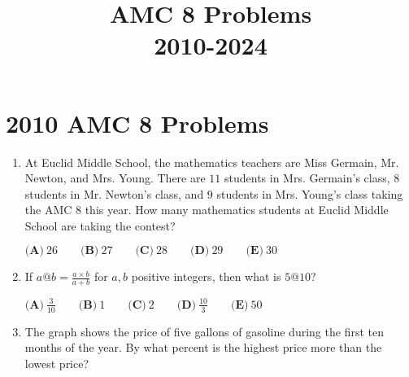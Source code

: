 \documentclass{article}
\title{AMC 8 Problems \\ 2010-2024}
\date{}
\begin{document}
\maketitle\thispagestyle{fancy}\tableofcontents\newpage\section*{2010 AMC 8 Problems}

\begin{enumerate}[label=\arabic*., itemsep=0.5em]
\item At Euclid Middle School, the mathematics teachers are Miss Germain, Mr. Newton, and Mrs. Young. There are \(11\) students in Mrs. Germain's class, \(8\) students in Mr. Newton's class, and \(9\) students in Mrs. Young's class taking the AMC 8 this year. How many mathematics students at Euclid Middle School are taking the contest? 

\( \textbf{(A)}\ 26 \qquad\textbf{(B)}\ 27\qquad\textbf{(C)}\ 28\qquad\textbf{(D)}\ 29\qquad\textbf{(E)}\ 30 \)\par \vspace{0.5em}\item If \(a @ b = \frac{a\times b}{a+b}\) for \(a,b\) positive integers, then what is \(5 @ 10\)? 

\(\textbf{(A)}\ \frac{3}{10} \qquad\textbf{(B)}\ 1 \qquad\textbf{(C)}\ 2 \qquad\textbf{(D)}\ \frac{10}{3} \qquad\textbf{(E)}\ 50\)\par \vspace{0.5em}\item The graph shows the price of five gallons of gasoline during the first ten months of the year. By what percent is the highest price more than the lowest price?



\end{enumerate}
\end{document}
